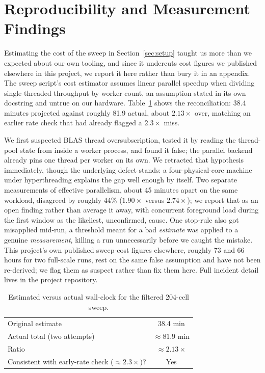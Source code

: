 \documentclass[conference]{IEEEtran}
\begin{document}
\section{Reproducibility and Measurement Findings}

Estimating the cost of the sweep in Section~\ref{sec:setup} taught us
more than we expected about our own tooling, and since it undercuts cost
figures we published elsewhere in this project, we report it here rather
than bury it in an appendix. The sweep script's cost estimator assumes
linear parallel speedup when dividing single-threaded throughput by
worker count, an assumption stated in its own docstring and untrue on our
hardware. Table~\ref{tab:estimate} shows the reconciliation: 38.4 minutes
projected against roughly 81.9 actual, about $2.13\times$ over, matching
an earlier rate check that had already flagged a $2.3\times$ miss.

We first suspected BLAS thread oversubscription, tested it by reading
the thread-pool state from inside a worker process, and found it false;
the parallel backend already pins one thread per worker on its own. We
retracted that hypothesis immediately, though the underlying defect
stands: a four-physical-core machine under hyperthreading explains the
gap well enough by itself. Two separate measurements of effective
parallelism, about 45 minutes apart on the same workload, disagreed by
roughly 44\% ($1.90\times$ versus $2.74\times$); we report that as an
open finding rather than average it away, with concurrent foreground load
during the first window as the likeliest, unconfirmed, cause. One
stop-rule also got misapplied mid-run, a threshold meant for a bad
\emph{estimate} was applied to a genuine \emph{measurement}, killing a
run unnecessarily before we caught the mistake. This project's own
published sweep-cost figures elsewhere, roughly 73 and 66 hours for two
full-scale runs, rest on the same false assumption and have not been
re-derived; we flag them as suspect rather than fix them here. Full
incident detail lives in the project repository.

\begin{table}[t]
\centering
\caption{Estimated versus actual wall-clock for the filtered 204-cell
sweep.}
\label{tab:estimate}
\footnotesize
\begin{tabular}{lc}
\hline
Original estimate & 38.4 min \\
Actual total (two attempts) & $\approx 81.9$ min \\
Ratio & $\approx 2.13\times$ \\
Consistent with early-rate check ($\approx 2.3\times$)? & Yes \\
\hline
\end{tabular}
\end{table}
\end{document}
